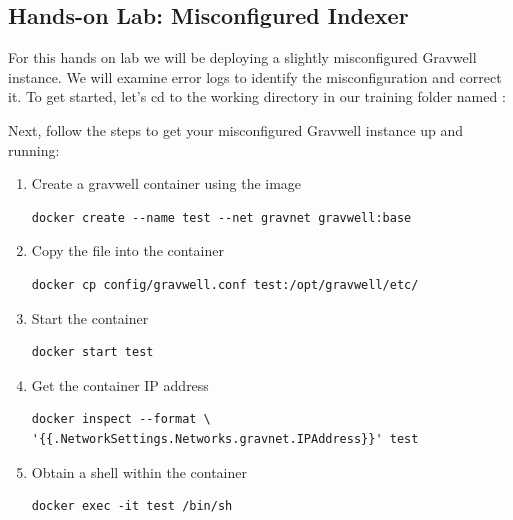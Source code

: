 \clearpage
\subsection{Hands-on Lab: Misconfigured Indexer}
\label{sec:MisconfiguredIndexer}

For this hands on lab we will be deploying a slightly misconfigured
Gravwell instance. We will examine error logs to identify the
misconfiguration and correct it. To get started, let's cd to the
working directory in our training folder named :


Next, follow the steps to get your misconfigured Gravwell instance up
and running:

\begin{enumerate}

\item Create a gravwell container using the  image
\begin{Verbatim}[breaklines=true]
docker create --name test --net gravnet gravwell:base
\end{Verbatim}

\item Copy the  file into the container
\begin{Verbatim}[breaklines=true]
docker cp config/gravwell.conf test:/opt/gravwell/etc/
\end{Verbatim}

\item Start the container

\begin{Verbatim}[breaklines=true]
docker start test
\end{Verbatim}

\item Get the container IP address
	\begin{Verbatim}[breaklines=true]
docker inspect --format \
'{{.NetworkSettings.Networks.gravnet.IPAddress}}' test
	\end{Verbatim}

\item Obtain a shell within the container
\begin{Verbatim}[breaklines=true]
docker exec -it test /bin/sh
\end{Verbatim}

\end{enumerate}

